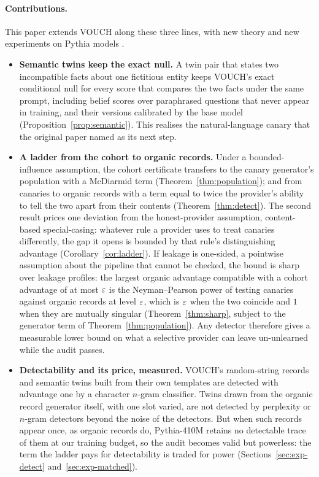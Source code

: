 \paragraph{Contributions.} This paper extends VOUCH along these three lines, with new
theory and new experiments on Pythia models \citep{biderman2023pythia}.

\begin{itemize}
\item \textbf{Semantic twins keep the exact null.} A twin pair that states two
incompatible facts about one fictitious entity keeps VOUCH's exact conditional null for
every score that compares the two facts under the same prompt, including belief scores
over paraphrased questions that never appear in training, and their versions calibrated
by the base model (Proposition~\ref{prop:semantic}). This realises the natural-language
canary that the original paper named as its next step.

\item \textbf{A ladder from the cohort to organic records.} Under a bounded-influence
assumption, the cohort certificate transfers to the canary generator's population with a
McDiarmid term (Theorem~\ref{thm:population}); and from canaries to organic records with
a term equal to twice the provider's ability to tell the two apart from their contents
(Theorem~\ref{thm:detect}). The second result prices one deviation from the
honest-provider assumption, content-based special-casing: whatever rule a provider uses to
treat canaries differently, the gap it opens is bounded by that rule's distinguishing
advantage (Corollary~\ref{cor:ladder}). If leakage is one-sided, a pointwise assumption
about the pipeline that cannot be checked, the bound is sharp over leakage profiles: the
largest organic advantage compatible with a cohort advantage of at most $\varepsilon$ is the
Neyman--Pearson power of testing canaries against organic records at level $\varepsilon$, which is
$\varepsilon$ when the two coincide and $1$ when they are mutually singular
(Theorem~\ref{thm:sharp}, subject to the generator term of Theorem~\ref{thm:population}). Any detector
therefore gives a measurable lower bound on what a selective provider can leave
un-unlearned while the audit passes.

\item \textbf{Detectability and its price, measured.} VOUCH's random-string records and
semantic twins built from their own templates are detected with advantage one by a
character $n$-gram classifier. Twins drawn from the organic record generator itself, with
one slot varied, are not detected by perplexity or $n$-gram detectors beyond the noise of
the detectors. But when such records appear once, as organic records do, Pythia-410M
retains no detectable trace of them at our training budget, so the audit becomes valid but
powerless: the term
the ladder pays for detectability is traded for power (Sections~\ref{sec:exp-detect}
and~\ref{sec:exp-matched}).


\end{itemize}
